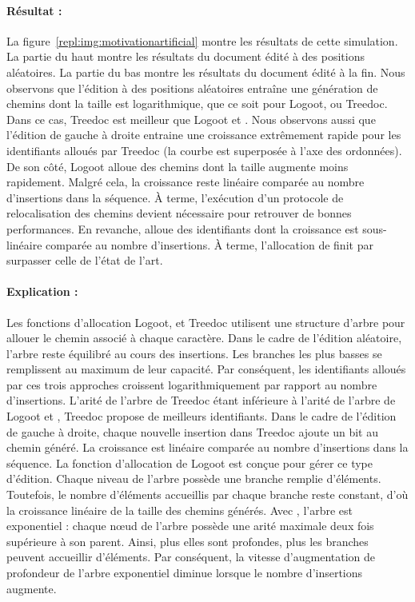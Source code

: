 \paragraph{Résultat :} La figure~\ref{repl:img:motivationartificial} montre les
résultats de cette simulation. La partie du haut montre les résultats du
document édité à des positions aléatoires. La partie du bas montre les résultats
du document édité à la fin. Nous observons que l'édition à des positions
aléatoires entraîne une génération de chemins dont la taille est logarithmique,
que ce soit pour Logoot, \LSEQ ou Treedoc. Dans ce cas, Treedoc est meilleur que
Logoot et \LSEQ. Nous observons aussi que l'édition de gauche à droite entraine
une croissance extrêmement rapide pour les identifiants alloués par Treedoc (la
courbe est superposée à l'axe des ordonnées). De son côté, Logoot alloue des
chemins dont la taille augmente moins rapidement. Malgré cela, la croissance
reste linéaire comparée au nombre d'insertions dans la séquence. À terme,
l'exécution d'un protocole de relocalisation des chemins devient nécessaire pour
retrouver de bonnes performances. En revanche, \LSEQ alloue des identifiants
dont la croissance est sous-linéaire comparée au nombre d'insertions. À terme,
l'allocation de \LSEQ finit par surpasser celle de l'état de l'art.

\paragraph{Explication :} Les fonctions d'allocation Logoot, \LSEQ et Treedoc
utilisent une structure d'arbre pour allouer le chemin associé à chaque
caractère. Dans le cadre de l'édition aléatoire, l'arbre reste équilibré au
cours des insertions. Les branches les plus basses se remplissent au maximum de
leur capacité. Par conséquent, les identifiants alloués par ces trois approches
croissent logarithmiquement par rapport au nombre d'insertions. L'arité de
l'arbre de Treedoc étant inférieure à l'arité de l'arbre de Logoot et \LSEQ,
Treedoc propose de meilleurs identifiants. Dans le cadre de l'édition de gauche
à droite, chaque nouvelle insertion dans Treedoc ajoute un bit au chemin
généré. La croissance est linéaire comparée au nombre d'insertions dans la
séquence.
La fonction d'allocation de Logoot est conçue pour gérer ce type
d'édition. Chaque niveau de l'arbre possède une branche remplie
d'éléments. Toutefois, le nombre d'éléments accueillis par chaque branche reste
constant, d'où la croissance linéaire de la taille des chemins générés. Avec
\LSEQ, l'arbre est exponentiel : chaque nœud de l'arbre possède une arité
maximale deux fois supérieure à son parent. Ainsi, plus elles sont profondes,
plus les branches peuvent accueillir d'éléments. Par conséquent, la vitesse
d'augmentation de profondeur de l'arbre exponentiel diminue lorsque le nombre
d'insertions augmente.


